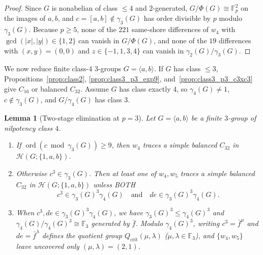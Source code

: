 \documentclass[11pt]{amsart}
\newtheorem{lemma}[theorem]{Lemma}
\theoremstyle{definition}
\theoremstyle{remark}
\newcommand{\F}{\mathbb{F}}
\newcommand{\Haar}{\mathcal{H}}
\newcommand{\ord}{\operatorname{ord}}
\begin{document}
\begin{proof}
Since $G$ is nonabelian of class $\le 4$ and $2$-generated, $G/\Phi(G) \cong \F_p^2$ on the images of $a, b$, and $c = [a,b] \notin \gamma_3(G)$ has order divisible by $p$ modulo $\gamma_3(G)$. Because $p \ge 5$, none of the $221$ same-shore differences of $w_4$ with $\gcd(|x|,|y|) \in \{1, 2\}$ can vanish in $G/\Phi(G)$, and none of the $19$ differences with $(x,y)=(0,0)$ and $z \in \{-1,1,3,4\}$ can vanish in $\gamma_2(G)/\gamma_3(G)$.
\end{proof}

We now reduce finite class-$4$ $3$-groups $G = \langle a, b \rangle$. If $G$ has class $\le 3$, Propositions~\ref{prop:class2}, \ref{prop:class3_p3_exp9}, and~\ref{prop:class3_p3_c3xc3} give $C_{16}$ or balanced $C_{32}$. Assume $G$ has class exactly $4$, so $\gamma_4(G) \ne 1$, $c \notin \gamma_3(G)$, and $G/\gamma_4(G)$ has class $3$.

\begin{lemma}[Two-stage elimination at $p = 3$]\label{lem:p3_descent}
Let $G = \langle a, b \rangle$ be a finite $3$-group of nilpotency class $4$.
\begin{enumerate}[label=(\arabic*)]
\item If $\ord(c \bmod \gamma_3(G)) \ge 9$, then $w_4$ traces a simple balanced $C_{32}$ in $\Haar(G; \{1,a,b\})$.
\item Otherwise $c^3 \in \gamma_3(G)$. Then at least one of $w_4, w_5$ traces a simple balanced $C_{32}$ in $\Haar(G; \{1,a,b\})$ unless BOTH
\[
c^3 \in \gamma_3(G)^3 \gamma_4(G) \quad\text{and}\quad d e \in \gamma_3(G)^3 \gamma_4(G).
\]
\item When $c^3, de \in \gamma_3(G)^3 \gamma_4(G)$, we have $\gamma_3(G)^3 \le \gamma_4(G)^3$ and $\gamma_4(G)/\gamma_4(G)^3 \cong \F_3$ generated by $\bar{f}$. Modulo $\gamma_4(G)^3$, writing $c^3 = \bar{f}^\mu$ and $de = \bar{f}^\lambda$ defines the quotient group $Q_{\mathrm{crit}}(\mu, \lambda)$ ($\mu, \lambda \in \F_3$), and $\{w_4, w_5\}$ leave uncovered only $(\mu, \lambda) = (2, 1)$.
\end{enumerate}
\end{lemma}
\end{document}
